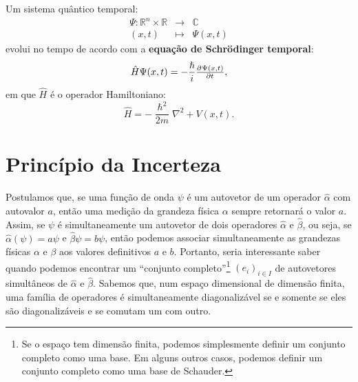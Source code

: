 \documentclass[11pt,twoside,a4paper]{book}
\begin{document}
\begin{postulado}
Um sistema quântico temporal:
\[
\begin{array}{rcl}
\Psi:\mathbb{R}^n\times\mathbb{R}&\rightarrow&\mathbb{C}\\
(x,t)&\mapsto&\Psi(x,t)
\end{array}
\]
evolui no tempo de acordo com a \textbf{equação de Schrödinger temporal}:
\[
\hat{H}\Psi(x,t)=-\frac{\hslash}{i}\pd{\Psi(x,t)}{t},
\]
em que $\hat{H}$ é o operador Hamiltoniano:
\[
\hat{H}=-\frac{\hslash^2}{2m}\nabla^2+V(x,t).
\]
\end{postulado}

\section{Princípio da Incerteza}

Postulamos que, se uma função de onda $\psi$ é um autovetor de um operador $\hat{\alpha}$ com autovalor $a$, então uma medição da grandeza física $\alpha$ sempre retornará o valor $a$. Assim, se $\psi$ é simultaneamente um autovetor de dois operadores $\hat{\alpha}$ e $\hat{\beta}$, ou seja, se $\hat{\alpha}(\psi)=a\psi$ e $\hat{\beta}\psi=b\psi$, então podemos associar simultaneamente as grandezas físicas $\alpha$ e $\beta$ aos valores definitivos $a$ e $b$. Portanto, seria interessante saber quando podemos encontrar um ``conjunto completo''\footnote{Se o espaço tem dimensão finita, podemos simplesmente definir um conjunto completo como uma base. Em alguns outros casos, podemos definir um conjunto completo como uma base de Schauder.} $(e_i)_{i\in I}$ de autovetores simultâneos de $\hat{\alpha}$ e $\hat{\beta}$. Sabemos que, num espaço dimensional de dimensão finita, uma família de operadores é simultaneamente diagonalizável se e somente se eles são diagonalizáveis e se comutam um com outro.

\printindex
\end{document}
